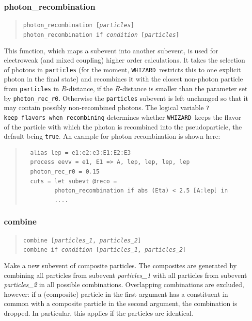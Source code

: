 \documentclass[12pt]{book}
\newcommand{\ttt}[1]{\texttt{#1}}
\newcommand{\whizard}{\ttt{WHIZARD}}
\begin{document}
\subsubsection{photon\_recombination}
\begin{quote}
\begin{footnotesize}
  \ttt{photon\_recombination [\textit{particles}]} \\
  \ttt{photon\_recombination if \textit{condition} [\textit{particles}]}
\end{footnotesize}
\end{quote}
This function, which maps a subevent into another subevent, is used for
electroweak (and mixed coupling) higher order calculations. It takes
the selection of photons in \texttt{particles} (for the moment,
\whizard\ restricts this to one explicit photon in the final state)
and recombines it with the closest non-photon particle from
\texttt{particles} in $R$-distance, if the $R$-distance is smaller
than the parameter set by \texttt{photon\_rec\_r0}.
Otherwise the \texttt{particles} subevent is left unchanged so
that it may contain possibly non-recombined photons.
The logical variable \texttt{?keep\_flavors\_when\_recombining}
determines whether \whizard\ keeps the flavor of the particle with
which the photon is recombined into the pseudoparticle, the default
being \texttt{true}.
An example for photon recombination is shown here:
\begin{quote}
\begin{footnotesize}
\begin{verbatim}
  alias lep = e1:e2:e3:E1:E2:E3
  process eevv = e1, E1 => A, lep, lep, lep, lep
  photon_rec_r0 = 0.15
  cuts = let subevt @reco =
         photon_recombination if abs (Eta) < 2.5 [A:lep] in
         ....
\end{verbatim}
\end{footnotesize}
\end{quote}


\subsubsection{combine}
\begin{quote}
\begin{footnotesize}
  \ttt{combine [\textit{particles\_1}, \textit{particles\_2}]} \\
  \ttt{combine if \textit{condition} [\textit{particles\_1}, \textit{particles\_2}]}
\end{footnotesize}
\end{quote}
Make a new subevent of composite particles.  The composites are generated by
combining all particles from subevent \textit{particles\_1} with all particles
from subevent \textit{particles\_2} in all possible combinations.  Overlapping
combinations are excluded, however: if a (composite) particle in the first
argument has a constituent in common with a composite particle in the second
argument, the combination is dropped.  In particular, this applies if the
particles are identical.
\end{document}
